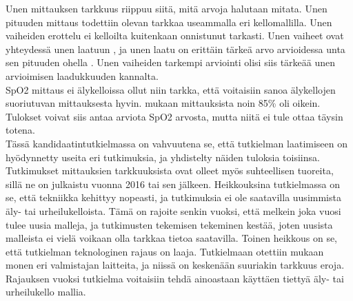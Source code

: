 \documentclass[utf8,bachelor,finnish]{bachelor}
\begin{document}
Unen mittauksen tarkkuus riippuu siitä, mitä arvoja halutaan mitata. Unen pituuden mittaus todettiin olevan tarkkaa useammalla eri kellomallilla.
 Unen vaiheiden erottelu ei kelloilta kuitenkaan onnistunut tarkasti. Unen vaiheet ovat yhteydessä unen laatuun \parencite{krystal_measuring_2008},
  ja unen laatu on erittäin tärkeä arvo arvioidessa unta sen pituuden ohella \parencite{kohyama_which_2021}. Unen vaiheiden
   tarkempi arviointi olisi siis tärkeää unen arvioimisen laadukkuuden kannalta.\\
  
SpO2 mittaus ei älykelloissa ollut niin tarkka, että voitaisiin sanoa älykellojen suoriutuvan mittauksesta hyvin.
 \textcite{patz_accuracy_2023} mukaan mittauksista noin 85\% oli oikein. Tulokset voivat siis antaa arviota SpO2 arvosta, mutta niitä ei tule ottaa
  täysin totena.\\

Tässä kandidaatintutkielmassa on vahvuutena se, että tutkielman laatimiseen on hyödynnetty useita eri tutkimuksia, ja yhdistelty näiden tuloksia toisiinsa.
 Tutkimukset mittauksien tarkkuuksista ovat olleet myös suhteellisen tuoreita, sillä ne on julkaistu vuonna 2016 tai sen jälkeen.
  Heikkouksina tutkielmassa on se, että tekniikka kehittyy nopeasti, ja tutkimuksia ei ole saatavilla uusimmista äly- tai urheilukelloista.
   Tämä on rajoite senkin vuoksi, että melkein joka vuosi tulee uusia malleja, ja tutkimusten tekemisen tekeminen kestää, joten uusista malleista
    ei vielä voikaan olla tarkkaa tietoa saatavilla.
     Toinen heikkous on se, että tutkielman teknologinen rajaus on laaja. Tutkielmaan otettiin mukaan monen eri valmistajan laitteita, ja niissä
      on keskenään suuriakin tarkkuus eroja. Rajauksen vuoksi tutkielma voitaisiin tehdä ainoastaan käyttäen tiettyä äly- tai urheilukello mallia.





\printbibliography
\end{document}
